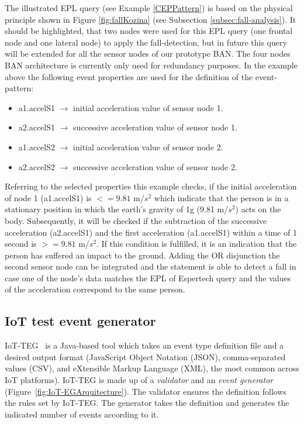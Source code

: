 \documentclass[review]{elsarticle}
\begin{document}
The illustrated EPL query (see Example \ref{CEPPattern}) is based on the physical principle shown in Figure \ref{fig:fallKozina} (see Subsection \ref{subsec:fall-analysis}). It should be highlighted, that two nodes were used for this EPL query (one frontal node and one lateral node) to apply the fall-detection, but in future this query will be extended for all the sensor nodes of our prototype BAN. The four nodes BAN architecture is currently only used for redundancy purposes. In the example above the following event properties are used for the definition of the event-pattern:
\begin{itemize}
	\item a1.accelS1 $\rightarrow$ initial acceleration value of sensor node 1.
	\item a2.accelS1 $\rightarrow$ successive acceleration value of sensor node 1.
	\item a1.accelS2 $\rightarrow$ initial acceleration value of sensor node 2.
	\item a2.accelS2 $\rightarrow$ successive acceleration value of sensor node 2.
\end{itemize}
Referring to the selected properties this example checks, if the initial acceleration of node 1 (a1.accelS1) is $<= 9.81$ m/$s^2$ which indicate that the person is in a stationary position in which the earth's gravity of 1g (9.81 m/$s^2$) acts on the body. Subsequently, it will be checked if the subtraction of the successive acceleration (a2.accelS1) and the first acceleration (a1.accelS1)  within a time of 1 second is $>= 9.81$ m/$s^2$. If this condition is fulfilled, it is an indication that the person has suffered an impact to the ground. Adding the OR disjunction the second sensor node can be integrated and the statement is able to detect a fall in case one of the node's data matches the EPL of Espertech query and the values of the acceleration correspond to the same person.
\subsection{IoT test event generator}
\label{iotteg}

IoT-TEG~\cite{Gutierrez2017,TesisGutierrez2017} is a Java-based tool which takes an event 
type definition file and a desired output format (JavaScript Object Notation (JSON), comma-separated values (CSV), and eXtensible Markup Language (XML), the most common across 
IoT platforms). IoT-TEG is made up of a \emph{validator} and an \emph{event generator} 
(Figure~\ref{fig:IoT-EGArquitecture}). The validator ensures the definition follows the rules set 
by IoT-TEG. The generator takes the definition and generates the indicated number of events according to it.
\end{document}

